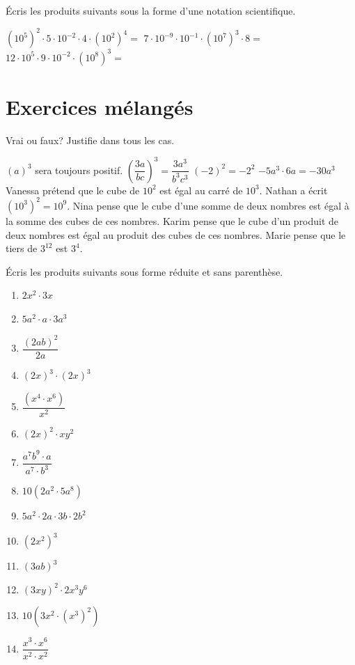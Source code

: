 \documentclass[../math2.tex]{subfiles}
\begin{document}
\begin{exercise}
	Écris les produits suivants sous la forme d'une notation scientifique.
	\begin{tasks}[after-item-skip=8em, after-skip=8em]
		\task $\left(10^5\right)^2\cdot 5\cdot 10^{-2}\cdot 4\cdot \left(10^2\right)^4=$
		\task $7\cdot 10^{-9}\cdot 10^{-1}\cdot \left(10^7\right)^3\cdot 8=$
		\task $12\cdot 10^5\cdot 9\cdot 10^{-2}\cdot \left(10^8\right)^3=$
	\end{tasks}
\end{exercise}

\section{Exercices mélangés}

\begin{exercise}
	Vrai ou faux? Justifie dans tous les cas.
	\begin{tasks}
		\task $(a)^3$ sera toujours positif.
		\task $\left(\dfrac{3a}{bc}\right)^3 =\dfrac{3a^3}{b^3c^3}$
		\task $(-2)^2=-2^2$
		\task $-5a^3\cdot 6a= -30a^3$
		\task Vanessa prétend que le cube de $10^2$ est égal au carré de $10^3$.
		\task Nathan a écrit $(10^3)^2=10^9$.
		\task Nina pense que le cube d'une somme de deux nombres est égal à la somme des cubes de ces nombres.
		\task Karim pense que le cube d'un produit de deux nombres est égal au produit des cubes de ces nombres.
		\task Marie pense que le tiers de $3^{12}$ est $3^4$.
	\end{tasks}
\end{exercise}

\begin{exercise}
	Écris les produits suivants sous forme réduite et sans parenthèse.
	\begin{enumerate} [cols=2]
		\item  $2x^2\cdot 3x$
		\item  $5a^2\cdot a\cdot 3a^3$
		\item  $\dfrac{(2ab)^2}{2a}$
		\item  $(2x)^3\cdot (2x)^3$
		\item  $\dfrac{\left(x^4\cdot x^6\right)}{x^2}$
		\item  $(2x)^2\cdot xy^2$
		\item  $\dfrac{a^7b^9\cdot a}{a^7\cdot b^3}$
		\item  $10(2a^2\cdot 5a^8)$
		\item  $5a^2\cdot 2a\cdot 3b\cdot 2b^2$
		\item  $(2x^2)^3$
		\item  $(3ab)^3$
		\item  $(3xy)^2\cdot 2x^3y^6$
		\item  $10\left(3x^2\cdot (x^3)^2\right)$
		\item  $\dfrac{x^3\cdot x^6}{x^2\cdot x^2}$
	\end{enumerate}
\end{exercise}
\end{document}
